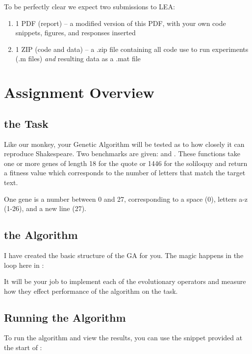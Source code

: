 \documentclass{article}
\begin{document}
To be perfectly clear we expect two submissions to LEA:
\begin{enumerate}
	\item 1 PDF (report) -- a modified version of this PDF, with your own code snippets, figures, and responses inserted
	\item 1 ZIP (code and data)   -- a .zip file containing all code use to run experiments (.m files) \textit{and} resulting data as a .mat file
\end{enumerate}

\newpage

\section{Assignment Overview}
\subsection*{the Task}
Like our monkey, your Genetic Algorithm will be tested as to how closely it can reproduce Shakespeare. Two benchmarks are given:  and . These functions take one or more genes of length 18 for the quote or 1446 for the soliloquy and return a fitness value which corresponds to the number of letters that match the target text.

One gene is a number between 0 and 27, corresponding to a space (0), letters a-z (1-26), and a new line (27).

\subsection*{the Algorithm}
I have created the basic structure of the GA for you. The magic happens in the loop here in :



It will be your job to implement each of the evolutionary operators and measure how they effect performance of the algorithm on the  task. 

\subsection*{Running the Algorithm}
	To run the algorithm and view the results, you can use the snippet provided at the start of :


\end{document}
